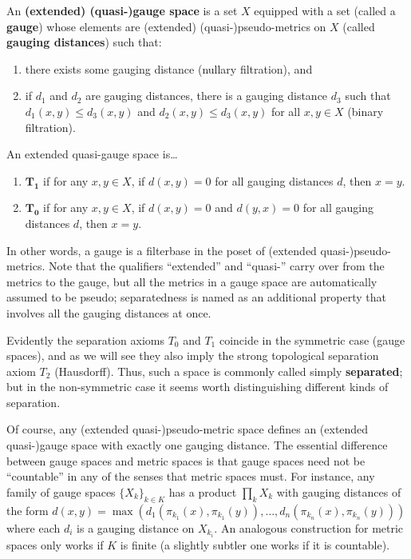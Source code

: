 \documentclass{article}
\begin{document}
\begin{defn}
  An \textbf{(extended) (quasi-)gauge space} is a set $X$ equipped with a set (called a \textbf{gauge}) whose elements are (extended) (quasi-)pseudo-metrics on $X$ (called \textbf{gauging distances}) such that:
  \begin{enumerate}
  \item there exists some gauging distance (nullary filtration), and
  \item if $d_1$ and $d_2$ are gauging distances, there is a gauging distance $d_3$ such that $d_1(x,y)\le d_3(x,y)$ and $d_2(x,y)\le d_3(x,y)$ for all $x,y\in X$ (binary filtration).
  \end{enumerate}
  An extended quasi-gauge space is\dots
  \begin{enumerate}[resume]
  \item $\mathbf{T_1}$ if for any $x,y\in X$, if $d(x,y)=0$ for all gauging distances $d$, then $x=y$.
  \item $\mathbf{T_0}$ if for any $x,y\in X$, if $d(x,y)=0$ and $d(y,x)=0$ for all gauging distances $d$, then $x=y$.
  \end{enumerate}
\end{defn}

In other words, a gauge is a filterbase in the poset of (extended quasi-)pseudo-metrics.
Note that the qualifiers ``extended'' and ``quasi-'' carry over from the metrics to the gauge, but all the metrics in a gauge space are automatically assumed to be pseudo; separatedness is named as an additional property that involves all the gauging distances at once.

Evidently the separation axioms $T_0$ and $T_1$ coincide in the symmetric case (gauge spaces), and as we will see they also imply the strong topological separation axiom $T_2$ (Hausdorff).
Thus, such a space is commonly called simply \textbf{separated}; but in the non-symmetric case it seems worth distinguishing different kinds of separation.

Of course, any (extended quasi-)pseudo-metric space defines an (extended quasi-)gauge space with exactly one gauging distance.
The essential difference between gauge spaces and metric spaces is that gauge spaces need not be ``countable'' in any of the senses that metric spaces must.
For instance, any family of gauge spaces $\{X_k\}_{k\in K}$ has a product $\prod_k X_k$ with gauging distances of the form $d(x,y) = \max(d_1(\pi_{k_1}(x),\pi_{k_1}(y)),\dots,d_n(\pi_{k_n}(x),\pi_{k_n}(y)))$ where each $d_i$ is a gauging distance on $X_{k_i}$.
An analogous construction for metric spaces only works if $K$ is finite (a slightly subtler one works if it is countable).
\end{document}
